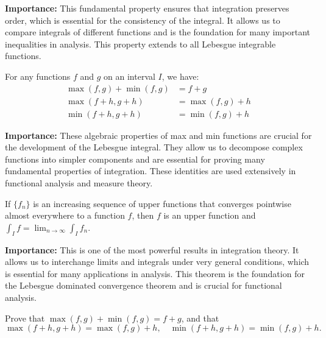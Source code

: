\noindent\textbf{Importance:} This fundamental property ensures that integration preserves order, which is essential for the consistency of the integral. It allows us to compare integrals of different functions and is the foundation for many important inequalities in analysis. This property extends to all Lebesgue integrable functions.



\begin{theorem}
For any functions $f$ and $g$ on an interval $I$, we have:
\begin{align*}
\max(f, g) + \min(f, g) &= f + g \\
\max(f + h, g + h) &= \max(f, g) + h \\
\min(f + h, g + h) &= \min(f, g) + h
\end{align*}
\end{theorem}

\noindent\textbf{Importance:} These algebraic properties of max and min functions are crucial for the development of the Lebesgue integral. They allow us to decompose complex functions into simpler components and are essential for proving many fundamental properties of integration. These identities are used extensively in functional analysis and measure theory.



\begin{theorem}
If $\{f_n\}$ is an increasing sequence of upper functions that converges pointwise almost everywhere to a function $f$, then $f$ is an upper function and $\int_I f = \lim_{n \to \infty} \int_I f_n$.
\end{theorem}

\noindent\textbf{Importance:} This is one of the most powerful results in integration theory. It allows us to interchange limits and integrals under very general conditions, which is essential for many applications in analysis. This theorem is the foundation for the Lebesgue dominated convergence theorem and is crucial for functional analysis.



\begin{problembox}
\begin{problemstatement}
Prove that $\max(f, g) + \min(f, g) = f + g$, and that 
\[ \max(f + h, g + h) = \max(f, g) + h, \quad \min(f + h, g + h) = \min(f, g) + h. \]
\end{problemstatement}
\end{problembox}

